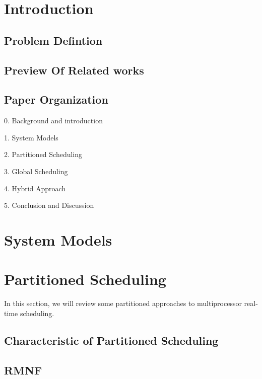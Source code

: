 \documentclass[preprint,12pt]{elsarticle}
\begin{document}
\linenumbers

\section{Introduction} \label{S:1}



\subsection{Problem Defintion}

\subsection{Preview Of Related works}

\subsection{Paper Organization}
0. Background and introduction

1. System Models

2. Partitioned Scheduling

3. Global Scheduling

4. Hybrid Approach

5. Conclusion and Discussion

\section{System Models} \label{S:2}
\subsection{}

\section{Partitioned Scheduling} \label{S:3}
In this section, we will review some partitioned approaches to multiprocessor real-time scheduling.
\subsection{Characteristic of Partitioned Scheduling}
\subsection{RMNF}
\end{document}
